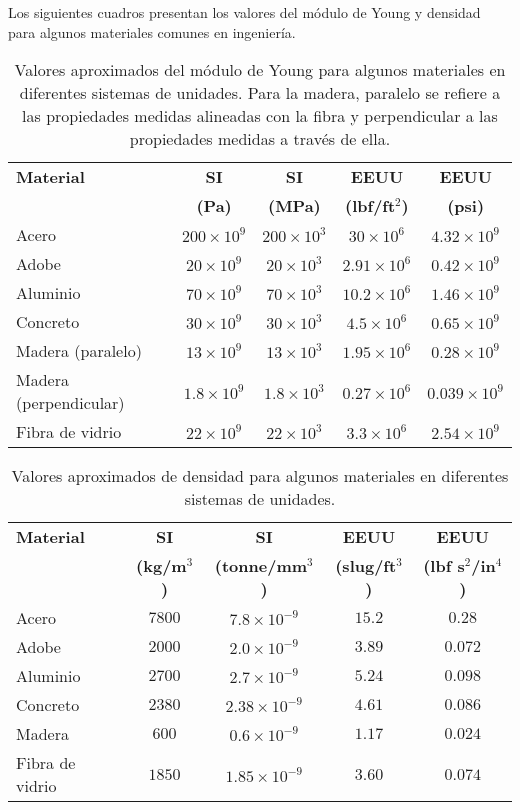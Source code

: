 Los siguientes cuadros presentan los valores del módulo de Young y densidad para algunos materiales comunes en ingeniería.
\begin{table}[h]
\centering
\begin{tabular}{lcccc}
\hline 
\textbf{Material} & \textbf{SI}  & \textbf{SI} & \textbf{EEUU} & \textbf{EEUU} \\
   & \textbf{(Pa)}  & \textbf{(MPa)} & \textbf{(lbf/ft$^2$)} & \textbf{(psi)} \\ 
\hline
Acero   &$200\times 10^9$ &$200\times 10^3$ &$30\times 10^6$ &$4.32\times 
10^9$\\
Adobe & $20 \times 10^9$ &$20 \times 10^3$ &$2.91 \times 10^6$ &$0.42 \times 
10^9$ \\
Aluminio &$70\times 10^9$ &$70 \times 10^3$ &$10.2 \times 10^6$ &$1.46 \times 10^9$\\
Concreto & $30\times 10^9$ &$30\times 10^3$ &$4.5\times 10^6$ &$0.65\times 
10^9$\\
Madera (paralelo) & $13\times 10^9$ &$13\times 10^3$ &$1.95\times 10^6$ 
&$0.28\times 10^9$\\
Madera (perpendicular) & $1.8\times 10^9$ &$1.8\times 10^3$ &$0.27\times 10^6$ 
&$0.039\times 10^9$\\
Fibra de vidrio & $22\times 10^9$ &$22\times 10^3$ &$3.3\times 10^6$ 
&$2.54\times 10^9$\\
\hline 
\end{tabular}
\caption{Valores aproximados del módulo de Young para algunos materiales en 
diferentes sistemas de unidades. Para la madera, paralelo se refiere a las 
propiedades medidas alineadas con la fibra y perpendicular a las propiedades
medidas a través de ella.}
\end{table}
\begin{table}[h]
\centering
\begin{tabular}{lcccc}
\hline 
\textbf{Material} & \textbf{SI}  & \textbf{SI} & \textbf{EEUU} & \textbf{EEUU} \\
 & \textbf{(kg/m$^3$)}  & \textbf{(tonne/mm$^3$)} & \textbf{(slug/ft$^3$)} & \textbf{(lbf s$^2$/in$^4$)} \\ 
\hline
Acero   &$7800$ &$7.8 \times 10^{-9}$ &$15.2$ &$0.28$\\
Adobe   &$2000$ &$2.0 \times 10^{-9}$ &$3.89$ &$0.072$\\
Aluminio &$2700$ &$2.7 \times 10^{-9}$ &$5.24$ &$0.098$\\
Concreto & $2380$ &$2.38 \times 10^{-9}$ &$4.61$ &$0.086$\\
Madera   &$600$ &$0.6 \times 10^{-9}$ &$1.17$ &$0.024$\\ 
Fibra de vidrio  &$1850$ &$1.85 \times 10^{-9}$ &$3.60$ &$0.074$\\
\hline 
\end{tabular}
\caption{Valores aproximados de densidad para algunos materiales en diferentes 
sistemas de unidades.}
\end{table}


